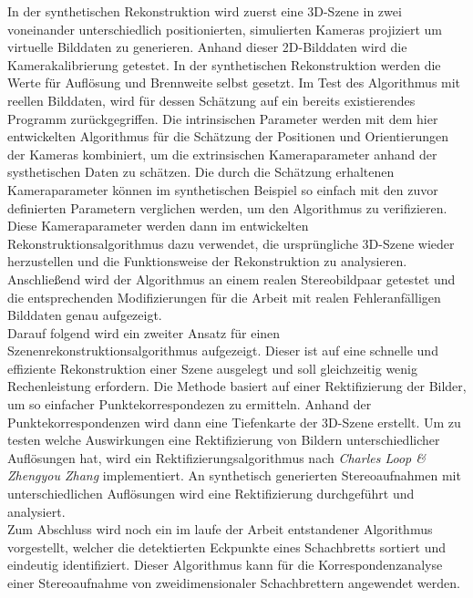 In der synthetischen Rekonstruktion wird zuerst eine 3D-Szene in zwei voneinander unterschiedlich positionierten, simulierten Kameras projiziert um virtuelle Bilddaten zu generieren. Anhand dieser 2D-Bilddaten wird die Kamerakalibrierung getestet. In der synthetischen Rekonstruktion werden die Werte für Auflösung und Brennweite selbst gesetzt. Im Test des Algorithmus mit reellen Bilddaten, wird für dessen Schätzung auf ein bereits existierendes Programm zurückgegriffen. Die intrinsischen Parameter werden mit dem hier entwickelten Algorithmus für die Schätzung der Positionen und Orientierungen der Kameras kombiniert, um die extrinsischen Kameraparameter anhand der systhetischen Daten zu schätzen.  Die durch die Schätzung erhaltenen Kameraparameter können im synthetischen Beispiel so einfach mit den zuvor definierten Parametern verglichen werden, um den Algorithmus zu verifizieren. Diese Kameraparameter werden dann im entwickelten Rekonstruktionsalgorithmus dazu verwendet, die ursprüngliche 3D-Szene wieder herzustellen und die Funktionsweise der Rekonstruktion zu analysieren. Anschließend wird der Algorithmus an einem realen Stereobildpaar getestet und die entsprechenden Modifizierungen für die Arbeit mit realen Fehleranfälligen Bilddaten genau aufgezeigt. \\

Darauf folgend wird ein zweiter Ansatz für einen Szenenrekonstruktionsalgorithmus aufgezeigt. Dieser ist auf eine schnelle und effiziente Rekonstruktion einer Szene ausgelegt und soll gleichzeitig wenig Rechenleistung erfordern. Die Methode basiert auf einer Rektifizierung der Bilder, um so einfacher Punktekorrespondezen zu ermitteln. Anhand der Punktekorrespondenzen wird dann eine Tiefenkarte der 3D-Szene erstellt. Um zu testen welche Auswirkungen eine Rektifizierung von Bildern unterschiedlicher Auflösungen hat, wird ein Rektifizierungsalgorithmus nach \textit{Charles Loop \& Zhengyou Zhang} implementiert. An synthetisch generierten Stereoaufnahmen mit unterschiedlichen Auflösungen wird eine Rektifizierung durchgeführt und analysiert.\\

Zum Abschluss wird noch ein im laufe der Arbeit entstandener Algorithmus vorgestellt, welcher die detektierten Eckpunkte eines Schachbretts sortiert und eindeutig identifiziert. Dieser Algorithmus kann für die Korrespondenzanalyse einer Stereoaufnahme von zweidimensionaler Schachbrettern angewendet werden.




